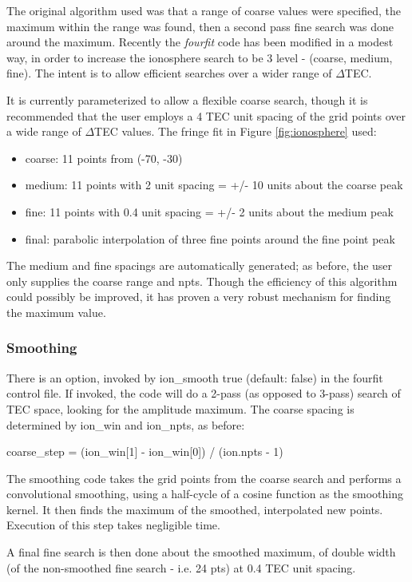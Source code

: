 The original algorithm used was that a range of coarse values 
were specified, the maximum within the range was found, then a second pass fine search
was done around the maximum. 
Recently the \textit{fourfit} code has been modified in a modest way,
in order to increase
the ionosphere search to be 3 level - (coarse, medium, fine). The
intent is to allow efficient searches over a wider range of $\Delta$TEC.

It is currently parameterized to allow a flexible coarse search, though
it is recommended that the user employs a 4 TEC unit spacing 
of the grid points over a wide range of $\Delta$TEC values. The fringe fit 
in Figure \ref{fig:ionosphere} used:
\begin{itemize}
    \item{coarse}: 11 points from (-70, -30)
    \item{medium}: 11 points with 2 unit spacing = +/- 10 units about the coarse peak
    \item{fine}: 11 points with 0.4 unit spacing = +/- 2 units about the medium peak
    \item{final}: parabolic interpolation of three fine points around the fine point peak
\end{itemize}

The medium and fine spacings are automatically generated; as before,
the user only supplies the coarse range and npts.
Though the efficiency of this algorithm could possibly
be improved, it has proven a very robust mechanism for finding the maximum value.

\subsubsection {Smoothing}

There is an option, invoked by ion\_smooth true (default: false)
in the fourfit control file. If invoked, the
code will do a 2-pass (as opposed to 3-pass) search
of TEC space, looking for the amplitude maximum. The
coarse spacing is determined by ion\_win and ion\_npts,
as before:

coarse\_step = (ion\_win[1] - ion\_win[0]) / (ion.npts - 1)

The smoothing code takes the grid points from the coarse
search and performs a convolutional smoothing, using
a half-cycle of a cosine function as the smoothing kernel.
It then finds the maximum of the smoothed, interpolated
new points. Execution of this step takes negligible time.

A final fine search is then done about the smoothed
maximum, of double width (of the non-smoothed fine search
- i.e. 24 pts) at 0.4 TEC unit spacing.

